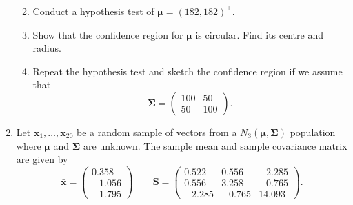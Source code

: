 \documentclass[]{book}
\providecommand{\tightlist}{%
  \setlength{\itemsep}{0pt}\setlength{\parskip}{0pt}}
\theoremstyle{definition}
\theoremstyle{definition}
\theoremstyle{definition}
\theoremstyle{remark}
\begin{document}
\begin{enumerate}
  \begin{enumerate}
  \def\labelenumii{\roman{enumii}.}
  \tightlist
  \item
    Conduct a hypothesis test of \({\boldsymbol{\mu}}= (182,182)^\top\).
  \item
    Show that the confidence region for \({\boldsymbol{\mu}}\) is circular. Find its centre and radius.
  \item
    Repeat the hypothesis test and sketch the confidence region if we assume that
    \[\boldsymbol{\Sigma}= \begin{pmatrix} 100 & 50 \\ 50 & 100 \end{pmatrix}.\]
  \end{enumerate}
\item
  Let \(\mathbf x_1, \ldots, \mathbf x_{20}\) be a random sample of vectors from a \(N_3({\boldsymbol{\mu}},\boldsymbol{\Sigma})\) population where \({\boldsymbol{\mu}}\) and \(\boldsymbol{\Sigma}\) are unknown. The sample mean and sample covariance matrix are given by
  \[\bar{\mathbf x} = \begin{pmatrix} 0.358 \\ -1.056 \\ -1.795 \end{pmatrix} \qquad
  \mathbf S= \begin{pmatrix} 0.522 & 0.556 & -2.285 \\ 0.556 & 3.258 & -0.765 \\ -2.285 & -0.765 & 14.093 \end{pmatrix}.\]


\end{enumerate}
\end{document}
